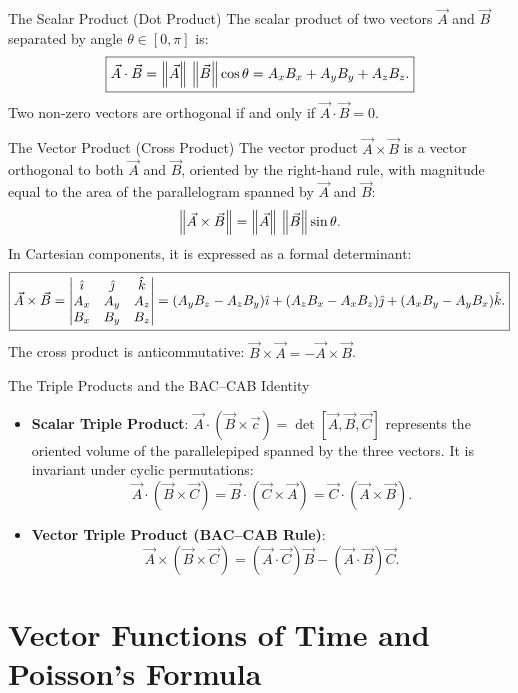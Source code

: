 \begin{definitionbox}{The Scalar Product (Dot Product)}
The scalar product of two vectors $\vec{A}$ and $\vec{B}$ separated by angle $\theta \in [0, \pi]$ is:
\[
\boxed{\vec{A}\cdot\vec{B} = \left\lVert \vec{A} \right\rVert\,\left\lVert \vec{B} \right\rVert\cos\theta = A_x B_x + A_y B_y + A_z B_z.}
\]
Two non-zero vectors are orthogonal if and only if $\vec{A}\cdot\vec{B} = 0$.
\end{definitionbox}

\begin{definitionbox}{The Vector Product (Cross Product)}
The vector product $\vec{A}\times\vec{B}$ is a vector orthogonal to both $\vec{A}$ and $\vec{B}$, oriented by the right-hand rule, with magnitude equal to the area of the parallelogram spanned by $\vec{A}$ and $\vec{B}$:
\[
\left\lVert \vec{A}\times\vec{B} \right\rVert = \left\lVert \vec{A} \right\rVert\,\left\lVert \vec{B} \right\rVert\sin\theta.
\]
In Cartesian components, it is expressed as a formal determinant:
\[
\boxed{\vec{A}\times\vec{B} = \begin{vmatrix} \hat{\imath} & \hat{\jmath} & \hat{k} \\ A_x & A_y & A_z \\ B_x & B_y & B_z \end{vmatrix} = (A_y B_z - A_z B_y)\hat{\imath} + (A_z B_x - A_x B_z)\hat{\jmath} + (A_x B_y - A_y B_x)\hat{k}.}
\]
The cross product is anticommutative: $\vec{B}\times\vec{A} = -\vec{A}\times\vec{B}$.
\end{definitionbox}

\begin{lawbox}{The Triple Products and the BAC--CAB Identity}
\begin{itemize}[leftmargin=1.4em,itemsep=3pt]
  \item \textbf{Scalar Triple Product}: $\vec{A}\cdot(\vec{B}\times\vec{c}) = \det[\vec{A}, \vec{B}, \vec{C}]$ represents the oriented volume of the parallelepiped spanned by the three vectors. It is invariant under cyclic permutations:
        \[
        \vec{A}\cdot(\vec{B}\times\vec{C}) = \vec{B}\cdot(\vec{C}\times\vec{A}) = \vec{C}\cdot(\vec{A}\times\vec{B}).
        \]
  \item \textbf{Vector Triple Product (BAC--CAB Rule)}:
        \[
        \boxed{\vec{A}\times(\vec{B}\times\vec{C}) = (\vec{A}\cdot\vec{C})\vec{B} - (\vec{A}\cdot\vec{B})\vec{C}.}
        \]
\end{itemize}
\end{lawbox}

\section{Vector Functions of Time and Poisson's Formula}

